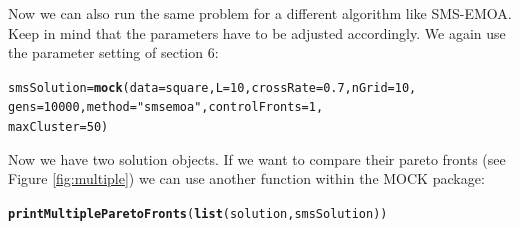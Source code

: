 \documentclass[parskip=half,DIV=14]{scrartcl}\usepackage[]{graphicx}\usepackage[]{color}
\makeatletter
\newcommand{\hlnum}[1]{\textcolor[rgb]{0.686,0.059,0.569}{#1}}%
\newcommand{\hlstr}[1]{\textcolor[rgb]{0.192,0.494,0.8}{#1}}%
\newcommand{\hlstd}[1]{\textcolor[rgb]{0.345,0.345,0.345}{#1}}%
\newcommand{\hlkwb}[1]{\textcolor[rgb]{0.69,0.353,0.396}{#1}}%
\newcommand{\hlkwc}[1]{\textcolor[rgb]{0.333,0.667,0.333}{#1}}%
\newcommand{\hlkwd}[1]{\textcolor[rgb]{0.737,0.353,0.396}{\textbf{#1}}}%
\newenvironment{kframe}{%
 \def\at@end@of@kframe{}%
 \ifinner\ifhmode%
  \def\at@end@of@kframe{\end{minipage}}%
  \begin{minipage}{\columnwidth}%
 \fi\fi%
 \def\FrameCommand##1{\hskip\@totalleftmargin \hskip-\fboxsep
 \colorbox{shadecolor}{##1}\hskip-\fboxsep
     \hskip-\linewidth \hskip-\@totalleftmargin \hskip\columnwidth}%
 \MakeFramed {\advance\hsize-\width
   \@totalleftmargin\z@ \linewidth\hsize
   \@setminipage}}%
 {\par\unskip\endMakeFramed%
 \at@end@of@kframe}
\newenvironment{knitrout}{}{} %
\makeatother
\begin{document}
Now we can also run the same problem for a different algorithm like SMS-EMOA. Keep in mind that the parameters have to be adjusted accordingly. We again use the parameter setting of section 6:

\begin{knitrout}
\color{fgcolor}\begin{kframe}
\begin{alltt}
\hlstd{smsSolution} \hlkwb{=}  \hlkwd{mock}\hlstd{(}\hlkwc{data} \hlstd{= square,}\hlkwc{L} \hlstd{=} \hlnum{10}\hlstd{,}\hlkwc{crossRate} \hlstd{=} \hlnum{0.7}\hlstd{,}\hlkwc{nGrid} \hlstd{=} \hlnum{10}\hlstd{,}
                    \hlkwc{gens} \hlstd{=} \hlnum{10000}\hlstd{,}\hlkwc{method}\hlstd{=}\hlstr{"smsemoa"}\hlstd{,}\hlkwc{controlFronts} \hlstd{=} \hlnum{1}\hlstd{,}
                    \hlkwc{maxCluster}\hlstd{=}\hlnum{50}\hlstd{)}
\end{alltt}
\end{kframe}
\end{knitrout}



Now we have two solution objects. If we want to compare their pareto fronts (see Figure \ref{fig:multiple}) we can use another function within the MOCK package:
\begin{knitrout}
\color{fgcolor}\begin{kframe}
\begin{alltt}
\hlkwd{printMultipleParetoFronts}\hlstd{(}\hlkwd{list}\hlstd{(solution,smsSolution))}
\end{alltt}
\end{kframe}
\end{knitrout}
\end{document}
